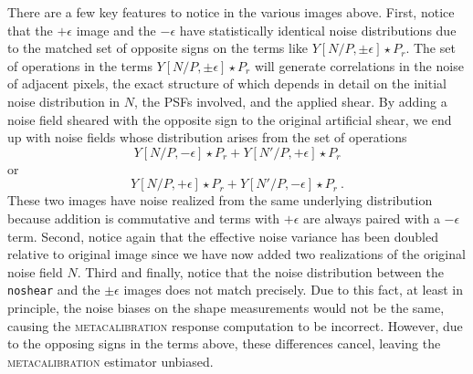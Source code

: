 \documentclass[twocolumn]{openjournal}
\makeatletter
\newcommand{\mcal}{\textsc{metacalibration}\@\xspace}
\newcommand{\noshear}{\texttt{noshear}\@\xspace}
\makeatother
\begin{document}
There are a few key features to notice in the various images above. First, notice that
the $+\epsilon$ image and the $-\epsilon$ have statistically identical noise
distributions due to the matched set of opposite signs on the terms like
$Y[N/P,\pm\epsilon] \star P_r$. The set of operations in the terms
$Y[N/P,\pm\epsilon] \star P_r$  will generate correlations in the noise of adjacent
pixels, the exact structure of which depends in  detail on the initial noise
distribution in $N$, the PSFs involved, and the applied shear. By adding a noise field
sheared with the opposite sign to the original artificial shear, we end up with noise
fields whose distribution arises from the set of operations
\begin{equation*}
Y[N/P, -\epsilon] \star P_r + Y[N'/P, +\epsilon] \star P_r
\end{equation*}
or
\begin{equation*}
Y[N/P, +\epsilon] \star P_r + Y[N'/P, -\epsilon] \star P_r\ .
\end{equation*}
These two images have noise realized from the same underlying distribution because
addition is commutative and terms with $+\epsilon$ are always paired with a $-\epsilon$
term. Second, notice again that the effective noise variance has been doubled relative
to original image since we have now added two realizations of the original noise field
$N$. Third and finally, notice that the noise distribution between the \noshear and the
$\pm\epsilon$ images does not match precisely. Due to this fact, at least in principle,
the noise biases on the shape measurements would not be the same, causing the \mcal
response computation to be incorrect. However, due to the opposing signs in the terms
above, these differences cancel, leaving the \mcal estimator unbiased.
\end{document}
